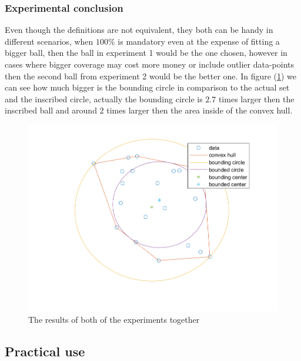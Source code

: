 \documentclass[]{article}
\begin{document}
\subsubsection{Experimental conclusion}
Even though the definitions are not equivalent, they both can be handy in different scenarios, when $100\%$ is mandatory even at the expense of fitting a bigger ball, then the ball in experiment 1 would be the one chosen, however in cases where bigger coverage may cost more money or include outlier data-points then the second ball from experiment 2 would be the better one.
In figure (\ref{both}) we can see how much bigger is the bounding circle in comparison to the actual set and the inscribed circle, actually the bounding circle is $2.7$ times larger then the inscribed ball and around $2$ times larger then the area inside of the convex hull.

\begin{figure}[!h]
	\centering
	\includegraphics[width=\textwidth]{both}
	\caption{The results of both of the experiments together}
	\label{both}
\end{figure}

\subsection{Practical use}
\end{document}

